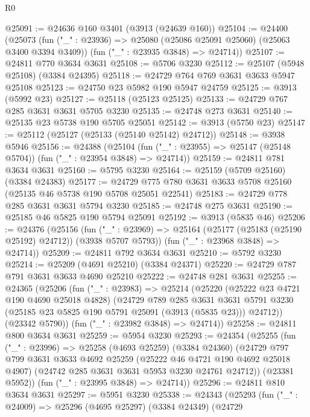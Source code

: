 \begin{lexlean}{R0}
\begin{coremodule}
@25091 := @24636 @160 @3401 (@3913 (@24639 @160))
@25104 := @24400
    (@25073
      (fun ("_" : @23936) => @25080 (@25086 @25091 @25060) (@25063 @3400 @3394 @3409))
      (fun ("_" : @23935 @3848) => @24714))
@25107 := @24811 @770 @3634 @3631
@25108 := @5706 @3230
@25112 := @25107 (@5948 @25108) (@3384 @24395)
@25118 := @24729 @764 @769 @3631 @3633 @5947 @25108
@25123 := @24750 @23 @5982 @190 @5947 @24759
@25125 := @3913 (@5992 @23)
@25127 := @25118 (@25123 @25125)
@25133 := @24729 @767 @285 @3631 @3631 @5705 @3230
@25135 := @24748 @273 @3631
@25140 := @25135 @23 @5738 @190 @5705 @25051
@25142 := @3913 (@5750 @23)
@25147 := @25112 (@25127 (@25133 (@25140 @25142) @24712))
@25148 := @3938 @5946
@25156 := @24388
    (@25104 (fun ("_" : @23955) => @25147 (@25148 @5704)) (fun ("_" : @23954 @3848) => @24714))
@25159 := @24811 @781 @3634 @3631
@25160 := @5795 @3230
@25164 := @25159 (@5709 @25160) (@3384 @24383)
@25177 := @24729 @775 @780 @3631 @3633 @5708 @25160 (@25135 @46 @5738 @190 @5708 @25051 @22541)
@25183 := @24729 @778 @285 @3631 @3631 @5794 @3230
@25185 := @24748 @275 @3631
@25190 := @25185 @46 @5825 @190 @5794 @25091
@25192 := @3913 (@5835 @46)
@25206 := @24376
    (@25156
      (fun ("_" : @23969) => @25164 (@25177 (@25183 (@25190 @25192) @24712)) (@3938 @5707 @5793))
      (fun ("_" : @23968 @3848) => @24714))
@25209 := @24811 @792 @3634 @3631
@25210 := @5792 @3230
@25214 := @25209 (@4691 @25210) (@3384 @24371)
@25220 := @24729 @787 @791 @3631 @3633 @4690 @25210
@25222 := @24748 @281 @3631
@25255 := @24365
    (@25206
      (fun ("_" : @23983) =>
      @25214
        (@25220
          (@25222 @23 @4721 @190 @4690 @25018 @4828)
          (@24729
            @789
            @285
            @3631
            @3631
            @5791
            @3230
            (@25185 @23 @5825 @190 @5791 @25091 (@3913 (@5835 @23)))
            @24712))
        (@23342 @5790))
      (fun ("_" : @23982 @3848) => @24714))
@25258 := @24811 @800 @3634 @3631
@25259 := @5954 @3230
@25293 := @24354
    (@25255
      (fun ("_" : @23996) =>
      @25258
        (@4693 @25259)
        (@3384 @24360)
        (@24729
          @797
          @799
          @3631
          @3633
          @4692
          @25259
          (@25222 @46 @4721 @190 @4692 @25018 @4907)
          (@24742 @285 @3631 @3631 @5953 @3230 @24761 @24712))
        (@23381 @5952))
      (fun ("_" : @23995 @3848) => @24714))
@25296 := @24811 @810 @3634 @3631
@25297 := @5951 @3230
@25338 := @24343
    (@25293
      (fun ("_" : @24009) =>
      @25296
        (@4695 @25297)
        (@3384 @24349)
        (@24729

\end{coremodule}
\end{lexlean}
